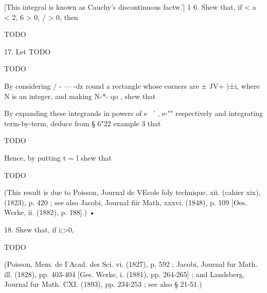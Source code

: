 [This integral is known as Cauchy's discontinuous factw.'] 1 6. Shew
that, if < a < 2, 6 > 0, / > 0, then

TODO

%
%

17. Let TODO

TODO

By considering / - — -dz round a rectangle whose corners are ± JV+
)±i, where N is an integer, and making N-*- qo , shew that

By expanding these integrands in powers of e~ ' , e-"" respectively
and integrating term-by-term, deduce from § 6"22 example 3 that

TODO

Hence, by putting t = l shew that

TODO

(This result is due to Poisson, Journal de VEcole foly technique, xii.
(cahier xix), (1823), p. 420 ; see also Jacobi, Journal fiir Math,
xxxvi. (1848), p. 109 [Oes. Werke, ii. (1882), p. 188].) •

18. Shew that, if i;>0,

TODO

(Poisson, Mem. de I'Acad. des Sci. vi. (1827), p. 592 ; Jacobi,
Journal fur Math. ill. (1828), pp. 403-404 [Ges. Werke, i. (1881), pp.
264-265] ; and Landsberg, Journal fur Math. CXI. (1893), pp. 234-253 ;
see also § 21-51.)

